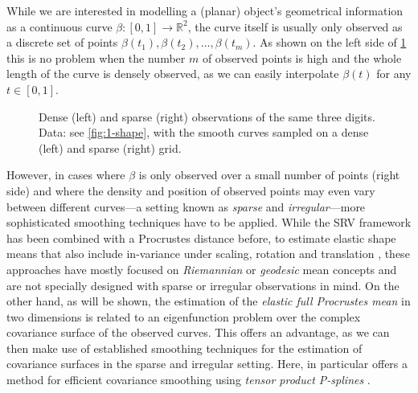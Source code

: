 While we are interested in modelling a (planar) object's geometrical information as a continuous curve $\beta : [0,1] \rightarrow \mathbb{R}^2$, the curve itself is usually only observed as a discrete set of points $\beta(t_1), \beta(t_2), \dots, \beta(t_m)$.
As shown on the left side of \cref{fig:1-sparse} this is no problem when the number $m$ of observed points is high and the whole length of the curve is densely observed, as we can easily interpolate $\beta(t)$ for any $t \in [0,1]$.
\begin{figure}
  \centering
  \begin{subfigure}{.48\textwidth}
    \centering
  \end{subfigure}\hfill%
  \begin{subfigure}{.48\textwidth}
    \centering
  \end{subfigure}
  \caption{Dense (left) and sparse (right) observations of the same three digits. Data: see \cref{fig:1-shape}, with the smooth curves sampled on a dense (left) and sparse (right) grid.}
  \label{fig:1-sparse}
\end{figure}
However, in cases where $\beta$ is only observed over a small number of points (right side) and where the density and position of observed points may even vary between different curves---a setting known as \emph{sparse} and \emph{irregular}---more sophisticated smoothing techniques have to be applied.
While the SRV framework has been combined with a Procrustes distance before, to estimate elastic shape means that also include in-variance under scaling, rotation and translation \parencite[see][]{SrivastavaEtAl2011}, these approaches have mostly focused on \emph{Riemannian} or \emph{geodesic} mean concepts and are not specially designed with sparse or irregular observations in mind.
On the other hand, as will be shown, the estimation of the \emph{elastic full Procrustes mean} in two dimensions is related to an eigenfunction problem over the complex covariance surface of the observed curves.
This offers an advantage, as we can then make use of established smoothing techniques for the estimation of covariance surfaces in the sparse and irregular setting.
Here, in particular \cite{CederbaumScheiplGreven2018} offers a method for efficient covariance smoothing using \emph{tensor product P-splines} \parencite[see e.g.][Chap. 8.2]{FahrmeierEtAl2013}.

